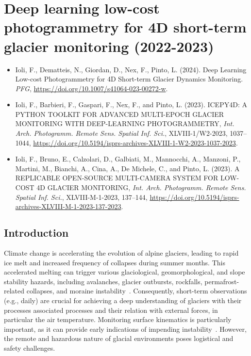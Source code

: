 \graphicspath{{figures/chapter4/}}
\onehalfspacing

\chapter{Deep learning low-cost photogrammetry for 4D short-term glacier monitoring
  (2022-2023)}

\vfill


\begin{itemize}
  \item Ioli, F., Dematteis, N., Giordan, D., Nex, F., Pinto, L. (2024). Deep Learning Low-cost Photogrammetry for 4D Short-term Glacier Dynamics Monitoring. \textit{PFG}, \footnotesize{\url{https://doi.org/10.1007/s41064-023-00272-w}}.
  \item Ioli, F., Barbieri, F., Gaspari, F., Nex, F., and Pinto, L. (2023). ICEPY4D: A PYTHON TOOLKIT FOR ADVANCED MULTI-EPOCH GLACIER MONITORING WITH DEEP-LEARNING PHOTOGRAMMETRY, \textit{Int. Arch. Photogramm. Remote Sens. Spatial Inf. Sci.}, XLVIII-1/W2-2023, 1037–1044, \footnotesize{\url{https://doi.org/10.5194/isprs-archives-XLVIII-1-W2-2023-1037-2023}}.
  \item Ioli, F., Bruno, E., Calzolari, D., Galbiati, M., Mannocchi, A., Manzoni, P., Martini, M., Bianchi, A., Cina, A., De Michele, C., and Pinto, L. (2023). A REPLICABLE OPEN-SOURCE MULTI-CAMERA SYSTEM FOR LOW-COST 4D GLACIER MONITORING, \textit{Int. Arch. Photogramm. Remote Sens. Spatial Inf. Sci.}, XLVIII-M-1-2023, 137–144, \footnotesize{\url{https://doi.org/10.5194/isprs-archives-XLVIII-M-1-2023-137-2023}}.
\end{itemize}

\newpage

\section{Introduction}\label{sec:4:intro}

Climate change is accelerating the evolution of alpine glaciers, leading to rapid ice melt and increased frequency of collapses during summer months. 
This accelerated melting can trigger various glaciological, geomorphological, and slope stability hazards, including avalanches, glacier outbursts, rockfalls, permafrost-related collapses, and moraine instability~\citep{Kaab2005, chiarle2023, Nigrelli2024}.
Consequently, short-term observations (e.g., daily) are crucial for achieving a deep understanding of glaciers with their processes associated processes and their relation with external forces, in particular the air temperature.
Monitoring surface kinematics is particularly important, as it can provide early indications of impending instability~\citep{Faillettaz2015}.
However, the remote and hazardous nature of glacial environments poses logistical and safety challenges. 

